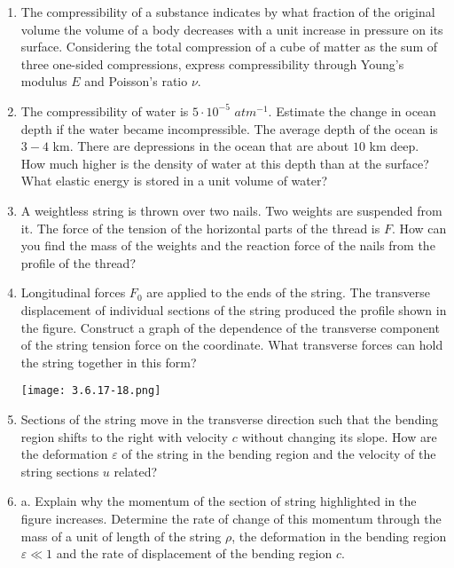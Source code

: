 \documentclass{article}
\begin{document}
\begin{enumerate}[label=3.6.\arabic*]
\item The compressibility of a substance indicates by what fraction of the original volume the volume of a body decreases with a unit increase in pressure on its surface. Considering the total compression of a cube of matter as the sum of three one-sided compressions, express compressibility through Young's modulus $E$ and Poisson's ratio $\nu$.

\item The compressibility of water is $5 \cdot 10^{-5}$ $atm^{-1}$. Estimate the change in ocean depth if the water became incompressible. The average depth of the ocean is $3-4$ km. There are depressions in the ocean that are about $10$ km deep. How much higher is the density of water at this depth than at the surface? What elastic energy is stored in a unit volume of water?

\item A weightless string is thrown over two nails. Two weights are suspended from it. The force of the tension of the horizontal parts of the thread is $F$. How can you find the mass of the weights and the reaction force of the nails from the profile of the thread?

\item Longitudinal forces $F_0$ are applied to the ends of the string. The transverse displacement of individual sections of the string produced the profile shown in the figure. Construct a graph of the dependence of the transverse component of the string tension force on the coordinate. What transverse forces can hold the string together in this form?

\begin{center}
    \texttt{[image: 3.6.17-18.png]}
\end{center}

\item Sections of the string move in the transverse direction such that the bending region shifts to the right with velocity $c$ without changing its slope. How are the deformation $\varepsilon$ of the string in the bending region and the velocity of the string sections $u$ related?

\item a. Explain why the momentum of the section of string highlighted in the figure increases. Determine the rate of change of this momentum through the mass of a unit of length of the string $\rho$, the deformation in the bending region $\varepsilon \ll 1$ and the rate of displacement of the bending region $c$.


\end{enumerate}
\end{document}
